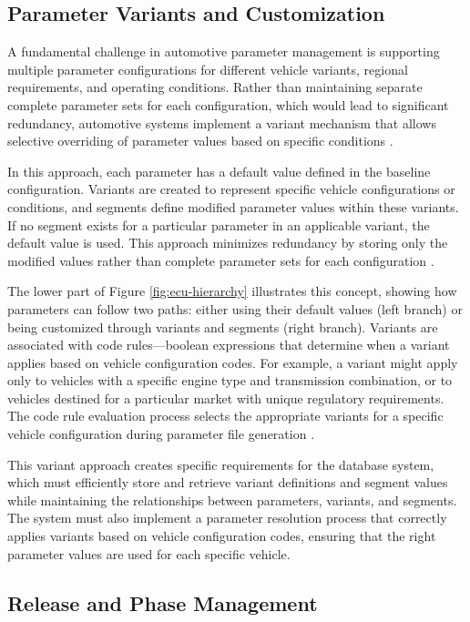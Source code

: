 \subsection{Parameter Variants and Customization}
\label{subsec:parameter-variants}

A fundamental challenge in automotive parameter management is supporting multiple parameter configurations for different vehicle variants, regional requirements, and operating conditions. Rather than maintaining separate complete parameter sets for each configuration, which would lead to significant redundancy, automotive systems implement a variant mechanism that allows selective overriding of parameter values based on specific conditions \cite{staron2021automotive}.

In this approach, each parameter has a default value defined in the baseline configuration. Variants are created to represent specific vehicle configurations or conditions, and segments define modified parameter values within these variants. If no segment exists for a particular parameter in an applicable variant, the default value is used. This approach minimizes redundancy by storing only the modified values rather than complete parameter sets for each configuration \cite{broy2006challenges}.

The lower part of Figure \ref{fig:ecu-hierarchy} illustrates this concept, showing how parameters can follow two paths: either using their default values (left branch) or being customized through variants and segments (right branch). Variants are associated with code rules—boolean expressions that determine when a variant applies based on vehicle configuration codes. For example, a variant might apply only to vehicles with a specific engine type and transmission combination, or to vehicles destined for a particular market with unique regulatory requirements. The code rule evaluation process selects the appropriate variants for a specific vehicle configuration during parameter file generation \cite{staron2021autosar}.

This variant approach creates specific requirements for the database system, which must efficiently store and retrieve variant definitions and segment values while maintaining the relationships between parameters, variants, and segments. The system must also implement a parameter resolution process that correctly applies variants based on vehicle configuration codes, ensuring that the right parameter values are used for each specific vehicle.

\subsection{Release and Phase Management}
\label{subsec:release-phase-management}

